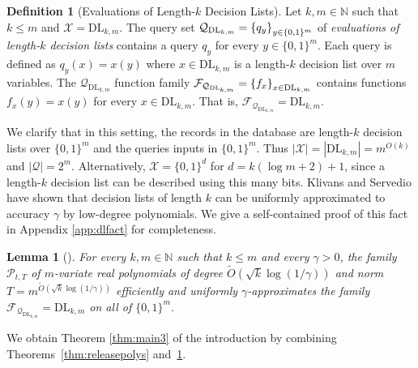 \documentclass[11pt]{article}
\newcommand\N{\mathbb{N}}
\newcommand\cF{\mathcal{F}}
\newcommand\cP{\mathcal{P}}
\newcommand\cQ{\mathcal{Q}}
\newcommand\cX{\mathcal{X}}
\newcommand\bits{\{0,1\}}
\newtheorem{lemma}[theorem]{Lemma}
\theoremstyle{definition}
\newtheorem{definition}[theorem]{Definition}
\begin{document}
\begin{definition}[Evaluations of Length-$k$ Decision Lists] Let $k, m \in \N$ such that $k \leq m$ and $\cX = \mathrm{DL}_{k,m}$.
The query set $\cQ_{\mathrm{DL}_{k,m}} = \set{q_y}_{y \in \bits^m}$ of \emph{evaluations of length-$k$ decision lists} contains a query $q_y$ for every $y \in \bits^m$.  Each query is defined as $q_y(x) = x(y)$ where $x \in \mathrm{DL}_{k,m}$ is a length-$k$ decision list over $m$ variables.
The $\cQ_{\mathrm{DL}_{k,m}}$ function family $\cF_{\cQ_{\mathrm{DL}_{k,m}}} = \set{f_x}_{x \in \mathrm{DL}_{k,m}}$ contains functions $f_x(y) = x(y)$ for every $x \in \mathrm{DL}_{k,m}$.  That is, $\cF_{\cQ_{\mathrm{DL}_{k,m}}} = \mathrm{DL}_{k,m}$.
\end{definition}


We clarify that in this setting, the records in the database are length-$k$ decision lists over $\bits^m$ and the queries inputs in $\bits^m$.  Thus $|\cX| = |\mathrm{DL}_{k,m}| = m^{O(k)}$ and $|\cQ| = 2^m$.  Alternatively, $\cX = \bits^d$ for $d = k(\log m + 2) + 1$, since a length-$k$ decision list can be described using this many bits.
\ifnum{}
Klivans and Servedio \cite[Claim 5.4]{KlivansSe04} have shown that decision lists of length $k$ can be uniformly approximated to accuracy $\gamma$ by low-degree polynomials.  We give a self-contained proof of this fact in Appendix \ref{app:dlfact} for completeness.
\else
\fi


\begin{lemma}[\cite{KlivansSe04}] \label{dlfact} For every $k, m \in \N$ such that $k \leq m$ and every $\gamma > 0$, the family $\cP_{t, T}$ of $m$-variate real polynomials of degree $\tilde{O}\left(\sqrt{k} \log(1/\gamma)\right)$ and norm $T = m^{\tilde{O}\left(\sqrt{k} \log(1/\gamma)\right)}$ efficiently and uniformly $\gamma$-approximates the family $\cF_{\cQ_{\mathrm{DL}_{k,m}}} = \mathrm{DL}_{k,m}$ on all of $\bits^m$.
\end{lemma}


We obtain Theorem \ref{thm:main3} of the introduction by combining Theorems~\ref{thm:releasepolys} and~\ref{dlfact}.  
\ifnum{}
\end{document}
